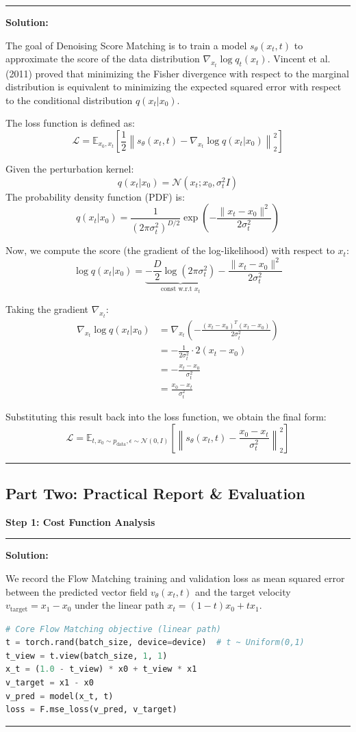 \documentclass[a4paper,12pt]{article}
\newenvironment{solutionbox}{
    \par
    \vspace{0.5em}
    \noindent
    {\color{primary}\rule{\linewidth}{0.4pt}}
    \par\smallskip
    \noindent\textbf{\color{primary}Solution:}
    \par\smallskip
    \small
}{
    \par\smallskip
    {\color{primary}\rule{\linewidth}{0.4pt}}
    \par\vspace{0.5em}
}
\begin{document}
\begin{solutionbox}
    The goal of Denoising Score Matching is to train a model $s_\theta(x_t, t)$ to approximate the score of the data distribution $\nabla_{x_t} \log q_t(x_t)$. Vincent et al. (2011) proved that minimizing the Fisher divergence with respect to the marginal distribution is equivalent to minimizing the expected squared error with respect to the conditional distribution $q(x_t|x_0)$.
    
    The loss function is defined as:
    \[ \mathcal{L} = \mathbb{E}_{x_0, x_t} \left[ \frac{1}{2} \left\| s_\theta(x_t, t) - \nabla_{x_t} \log q(x_t | x_0) \right\|^2_2 \right] \]
    
    Given the perturbation kernel:
    \[ q(x_t | x_0) = \mathcal{N}(x_t; x_0, \sigma_t^2 I) \]
    The probability density function (PDF) is:
    \[ q(x_t | x_0) = \frac{1}{(2\pi\sigma_t^2)^{D/2}} \exp \left( - \frac{\|x_t - x_0\|^2}{2\sigma_t^2} \right) \]
    
    Now, we compute the score (the gradient of the log-likelihood) with respect to $x_t$:
    \[ \log q(x_t | x_0) = \underbrace{-\frac{D}{2} \log(2\pi\sigma_t^2)}_{\text{const w.r.t } x_t} - \frac{\|x_t - x_0\|^2}{2\sigma_t^2} \]
    
    Taking the gradient $\nabla_{x_t}$:
    \begin{align*}
        \nabla_{x_t} \log q(x_t | x_0) &= \nabla_{x_t} \left( - \frac{(x_t - x_0)^T (x_t - x_0)}{2\sigma_t^2} \right) \\
        &= - \frac{1}{2\sigma_t^2} \cdot 2(x_t - x_0) \\
        &= - \frac{x_t - x_0}{\sigma_t^2} \\
        &= \frac{x_0 - x_t}{\sigma_t^2}
    \end{align*}
    
    Substituting this result back into the loss function, we obtain the final form:
    \[ \mathcal{L} = \mathbb{E}_{t, x_0 \sim p_{\text{data}}, \epsilon \sim \mathcal{N}(0, I)} \left[ \left\| s_\theta(x_t, t) - \frac{x_0 - x_t}{\sigma_t^2} \right\|^2_2 \right] \]
\end{solutionbox}
\newpage

\subsection{Part Two: Practical Report \& Evaluation}

\textbf{Step 1: Cost Function Analysis}
\begin{solutionbox}
    We record the Flow Matching training and validation loss as mean squared error between the predicted vector field $v_\theta(x_t,t)$ and the target velocity $v_{\text{target}} = x_1 - x_0$ under the linear path $x_t = (1-t)x_0 + t x_1$.

\begin{lstlisting}[language=Python]
# Core Flow Matching objective (linear path)
t = torch.rand(batch_size, device=device)  # t ~ Uniform(0,1)
t_view = t.view(batch_size, 1, 1)
x_t = (1.0 - t_view) * x0 + t_view * x1
v_target = x1 - x0
v_pred = model(x_t, t)
loss = F.mse_loss(v_pred, v_target)
\end{lstlisting}
\end{solutionbox}
\end{document}
